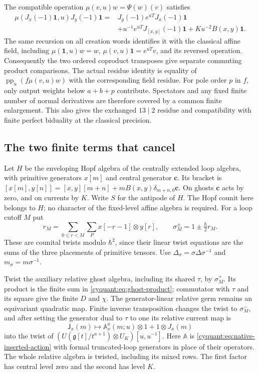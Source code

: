 The compatible operation $\mu(v,u)w=\Psi(w)(v)$ satisfies
\[
 \begin{aligned}
 \mu(J_x(-1)\mathbf1,u)J_y(-1)\mathbf1
 ={}&J_y(-1)e^{uT}J_x(-1)\mathbf1\\
 &+u^{-1}e^{uT}J_{[x,y]}(-1)\mathbf1
       +Ku^{-2}B(x,y)\mathbf1.
 \end{aligned}
\]
The same recursion on all creation words identifies it with the
classical affine field, including
$\mu(\mathbf1,u)w=w$, $\mu(v,u)\mathbf1=e^{uT}v$, and its reversed
operation.  Consequently the two ordered coproduct transposes give
separate commuting product comparisons.  The actual residue identity
is equality of
$\operatorname{pp}_u(f\mu(v,u)w)$ with the corresponding field
residue.  For pole order $p$ in $f$, only output weights below
$a+b+p$ contribute.  Spectators and any fixed finite number of normal
derivatives are therefore covered by a common finite enlargement.
This also gives the exchanged $13\mid2$ residue and compatibility
with finite perfect biduality at the classical precision.

\subsection{The two finite terms that cancel}

Let $H$ be the enveloping Hopf algebra of the centrally extended loop
algebra, with primitive generators $x[m]$ and central generator
$\mathbf c$.  Its bracket is
$[x[m],y[n]]=[x,y][m+n]+mB(x,y)\delta_{m+n,0}\mathbf c$.
On ghosts $\mathbf c$ acts by zero, and on currents by $K$.
Write $S$ for the antipode of $H$.
The Hopf counit here belongs to $H$; no character of the fixed-level
affine algebra is required.
For a loop cutoff $M$ put
\[
 r_M=\sum_{0\leq r<M}\sum_Px[-r-1]\otimes y[r],
 \qquad \sigma_M^\pm=1\pm\tfrac\hbar2r_M.
\]
These are counital twists modulo $\hbar^2$, since their linear twist
equations are the sums of the three placements of primitive tensors.
Use $\Delta_\sigma=\sigma\Delta\sigma^{-1}$ and
$m_\sigma=m\sigma^{-1}$.

Twist the auxiliary relative ghost algebra, including its shared
$\tau$, by $\sigma_M^+$.  Its product is the finite sum in
\eqref{cyquant:eq:ghost-product}; commutator with $\tau$ and its
square give the finite $D$ and $\chi$.  The generator-linear relative
germ remains an equivariant quadratic map.  Finite inverse transposition
changes the twist to $\sigma_M^-$, and after setting the generator
dual to $\tau$ to one its relative current map is
\[
 \mathsf J_x(m)\longmapsto
          \mathbb A_x^a(m;u)\otimes1+1\otimes J_x(m)
\]
into the twist of
$(U(\mathfrak g[t]/t^{a+1})\otimes U_K)[u,u^{-1}]$.
Here $\mathbb A$ is \eqref{cyquant:eq:native-inserted-action} with
formal truncated-loop generators in place of their operators.
The whole relative algebra is twisted, including its mixed rows.
The first factor has central level zero and the second has level $K$.

